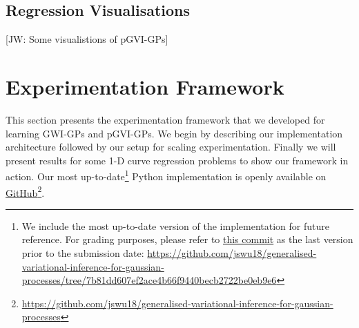 \documentclass{article}
\newcommand{\jw}[1]{{\color{gray} [JW: #1]}}
\numberwithin{equation}{section}
\begin{document}
\subsection{Regression Visualisations}
\jw{Some visualistions of pGVI-GPs}

\newpage
\section{Experimentation Framework}
This section presents the experimentation framework that we developed for learning GWI-GPs and pGVI-GPs.
We begin by describing our implementation architecture followed by our setup for scaling experimentation.
Finally we will present results for some 1-D curve regression problems to show our framework in action.
Our most up-to-date\footnote{We include the most up-to-date version of the implementation for future reference. For grading purposes, please refer to \href{https://github.com/jswu18/generalised-variational-inference-for-gaussian-processes/tree/7b81dd607ef2ace4b66f9440becb2722be0eb9e6}{this commit} as the last version prior to the submission date: \href{https://github.com/jswu18/generalised-variational-inference-for-gaussian-processes/tree/7b81dd607ef2ace4b66f9440becb2722be0eb9e6}{https://github.com/jswu18/generalised-variational-inference-for-gaussian-processes/tree/7b81dd607ef2ace4b66f9440becb2722be0eb9e6}} Python implementation is openly available on \href{https://github.com/jswu18/generalised-variational-inference-for-gaussian-processes}{GitHub}\footnote{\href{https://github.com/jswu18/generalised-variational-inference-for-gaussian-processes}{https://github.com/jswu18/generalised-variational-inference-for-gaussian-processes}}.
\end{document}
